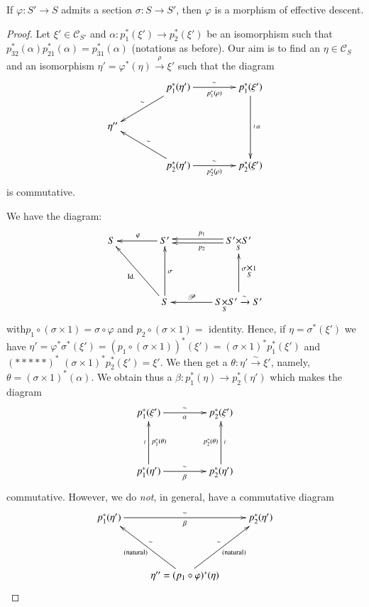 \setcounter{lemma}{1}
\begin{lemma}\label{lem7.1.2}
If $\varphi:S'\to S$ admits a section $\sigma:S\to S'$, then $\varphi$
is a morphism of effective descent.
\end{lemma}

\begin{proof}
Let $\xi'\in\mathscr{C}_{S'}$ and $\alpha:p^{\ast}_{1}(\xi')\to
p^{\ast}_{2}(\xi')$ be an isomorphism such that
$p^{\ast}_{32}(\alpha)p^{\ast}_{21}(\alpha)=p^{\ast}_{31}(\alpha)$
(notations as before). Our aim is to find an $\eta\in \mathscr{C}_{S}$
and an isomorphism $\eta'=\varphi^{\ast}(\eta)\xrightarrow{\rho}\xi'$
such that the diagram
\[
\xymatrix@C=1.5cm{
 & p^{\ast}_{1}(\eta')\ar[r]^{\sim}_{p^{\ast}_{1}(\rho)}\ar[dl]_{\sim} &
  p^{\ast}_{1}(\xi')\ar[dd]^{\wr\,\alpha} \\
\eta'' & &\\
& p^{\ast}_{2}(\eta')\ar[ul]_{\sim}\ar[r]^{\sim}_{p^{\ast}_{2}(\rho)} &
p^{\ast}_{2}(\xi') 
}
\]
is commutative.

We have the diagram:
\[
\xymatrix@=1.4cm{
S & S'\ar[l]_{\varphi} &
\fprod{S'}{S'}{S}\ar@<.2em>[l]^{p_{2}}\ar@<-.2em>[l]_{p_{1}} \\
 & S\ar[ul]^{\text{Id.}}\ar[u]_{\sigma} & \fprod{S}{S'}{S}\xrightarrow{\sim}S'\ar[l]_-{\mathscr{P}}\ar[u]_{\fprod{\sigma}{1}{S}}
}
\]
with\pageoriginale $p_{1}\circ(\sigma \times 1)=\sigma\circ\varphi$
and $p_{2}\circ(\sigma\times 1)=$ identity. Hence, if
$\eta=\sigma^{\ast}(\xi')$ we have
$\eta'=\varphi^{\ast}\sigma^{\ast}(\xi')=(p_{1}\circ (\sigma\times
1))^{\ast}(\xi')=(\sigma\times 1)^{\ast}p^{\ast}_{1}(\xi')$ and
$(*****)^{\ast}$ $(\sigma\times 1)^{\ast}p^{\ast}_{2}(\xi')=\xi'$. We
then get a $\theta:\eta'\xrightarrow{\sim} \xi'$, namely, $\theta=(\sigma\times
1)^{\ast}(\alpha)$. We obtain thus a $\beta:p^{\ast}_{1}(\eta)\to
p^{\ast}_{2}(\eta')$ which makes the diagram
\[
\xymatrix@=1.5cm{
p^{\ast}_{1}(\xi')\ar[r]^{\sim}_{\alpha} & p^{\ast}_{2}(\xi')\\
p^{\ast}_{1}(\eta')\ar[u]_{p^{\ast}_{1}(\theta)}^{\wr}\ar[r]^{\sim}_{\beta}
& p^{\ast}_{2}(\eta')\ar[u]_{\wr}^{p^{\ast}_{2}(\theta)}
}
\]
commutative. However, we do {\em not}, in general, have a commutative
diagram
\[
\xymatrix@R=1.5cm{
p^{\ast}_{1}(\eta')\ar[rr]^{\sim}_{\beta} & & p^{\ast}_{2}(\eta')\\
 & \eta''=(p_{1}\circ
\varphi)^{\ast}(\eta)\ar[ul]_{\sim}^{\text{(natural)}}\ar[ur]^{\sim}_{\text{(natural)}} &
}
\]


\end{proof}
